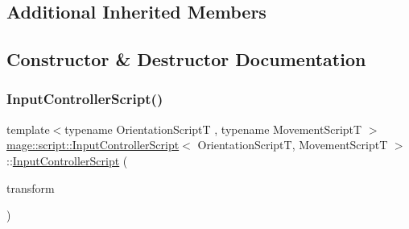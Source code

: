 \subsection*{Additional Inherited Members}


\subsection{Constructor \& Destructor Documentation}
\hypertarget{classmage_1_1script_1_1_input_controller_script_a15356387b73371d6edf546e18842547a}{}\label{classmage_1_1script_1_1_input_controller_script_a15356387b73371d6edf546e18842547a} 
\subsubsection{\texorpdfstring{Input\+Controller\+Script()}{InputControllerScript()}\hspace{0.1cm}{\footnotesize\ttfamily [1/3]}}
{\footnotesize\ttfamily template$<$typename Orientation\+ScriptT , typename Movement\+ScriptT $>$ \\
\hyperlink{classmage_1_1script_1_1_input_controller_script}{mage\+::script\+::\+Input\+Controller\+Script}$<$ Orientation\+ScriptT, Movement\+ScriptT $>$\+::\hyperlink{classmage_1_1script_1_1_input_controller_script}{Input\+Controller\+Script} (\begin{DoxyParamCaption}\item[{\hyperlink{classmage_1_1_transform_node}{Transform\+Node} $\ast$}]{transform }\end{DoxyParamCaption})\hspace{0.3cm}{\ttfamily [explicit]}}

\hypertarget{classmage_1_1script_1_1_input_controller_script_a42c6603b4c040e9b8fe62ca67023cb43}{}\label{classmage_1_1script_1_1_input_controller_script_a42c6603b4c040e9b8fe62ca67023cb43} 
